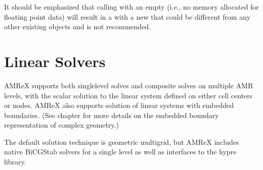 \documentclass[letterpaper,10pt,english]{sphinxmanual}
\begin{document}
\begin{sphinxVerbatim}[commandchars=\\\{\}]
         
    \PYG{p}{[}\PYG{p}{]}
                   
\end{sphinxVerbatim}

\sphinxAtStartPar
It should be emphasized that calling  with an empty
 (i.e., no memory allocated for floating point data)
will result in a  with a new 
that could be different from any other existing
 objects and is not recommended.


\chapter{Linear Solvers}
\label{\detokenize{LinearSolvers_Chapter:linear-solvers}}\label{\detokenize{LinearSolvers_Chapter:chap-linearsolvers}}\label{\detokenize{LinearSolvers_Chapter::doc}}
\sphinxAtStartPar
AMReX supports both single\sphinxhyphen{}level solves and composite solves on multiple AMR levels,
with the scalar solution to the linear system defined on either cell centers or nodes.
AMReX also supports solution of linear systems with embedded boundaries.
(See chapter {\hyperref[\detokenize{EB_Chapter:chap-eb}]{}} for more details on the embedded boundary representation of
complex geometry.)

\sphinxAtStartPar
The default solution technique is geometric multigrid, but AMReX includes native
BiCGStab solvers for a single level as well as interfaces to the hypre library.
\end{document}
